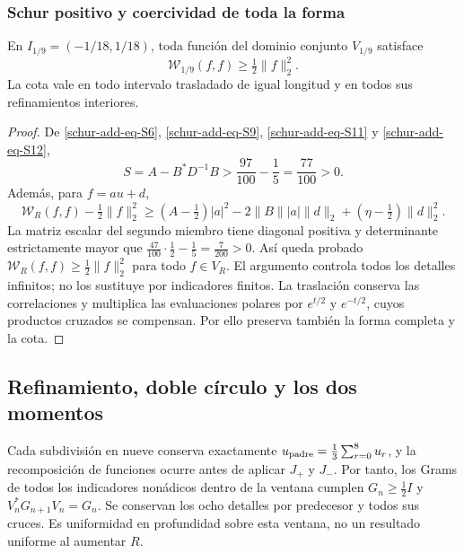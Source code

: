 \subsubsection{Schur positivo y coercividad de toda la forma}
\label{schur-add-sub-348}

\begin{theorem}
\label{schur-add:coercividad-ventana}
En \(I_{1/9}=(-1/18,1/18)\), toda función del dominio conjunto
\(V_{1/9}\) satisface
\[
\mathscr W_{1/9}(f,f)\geq\tfrac12\|f\|_2^2.
\]
La cota vale en todo intervalo trasladado de igual longitud y en todos
sus refinamientos interiores.
\end{theorem}
\begin{proof}
De \eqref{schur-add-eq-S6}, \eqref{schur-add-eq-S9},
\eqref{schur-add-eq-S11} y \eqref{schur-add-eq-S12},
\begin{equation}
S=A-B^*D^{-1}B>\frac{97}{100}-\frac15=\frac{77}{100}>0.
\label{schur-add-display-29}
\end{equation}
Además, para \(f=au+d\),
\begin{equation}
\mathscr W_R(f,f)-\tfrac12\|f\|_2^2
\geq(A-\tfrac12)|a|^2
-2\|B\||a|\|d\|_2+(\eta-\tfrac12)\|d\|_2^2.
\label{schur-add-display-30}
\end{equation}
La matriz escalar del segundo miembro tiene diagonal positiva y
determinante estrictamente mayor que
\(\tfrac{47}{100}\cdot\tfrac12-\tfrac15=\tfrac7{200}>0\).
Así queda probado \(\mathscr W_R(f,f)\geq\tfrac12\|f\|_2^2\)
para todo \(f\in V_R\). El argumento controla todos los detalles
infinitos; no los sustituye por indicadores finitos. La traslación
conserva las correlaciones y multiplica las evaluaciones polares
por \(e^{t/2}\) y \(e^{-t/2}\), cuyos productos cruzados se compensan.
Por ello preserva también la forma completa y la cota.
\end{proof}

\subsection{Refinamiento, doble círculo y los dos momentos}
\label{schur-add-sub-367}

Cada subdivisión en nueve conserva exactamente
\(u_{\rm padre}=\tfrac13\sum_{r=0}^8u_r\), y la recomposición de
funciones ocurre antes de aplicar \(J_+\) y \(J_-\). Por tanto,
los Grams de todos los indicadores nonádicos dentro de la ventana
cumplen \(G_n\geq\tfrac12 I\) y
\(V_n^*G_{n+1}V_n=G_n\). Se conservan los ocho detalles por predecesor y
todos sus cruces. Es uniformidad en profundidad sobre esta ventana,
no un resultado uniforme al aumentar \(R\).

